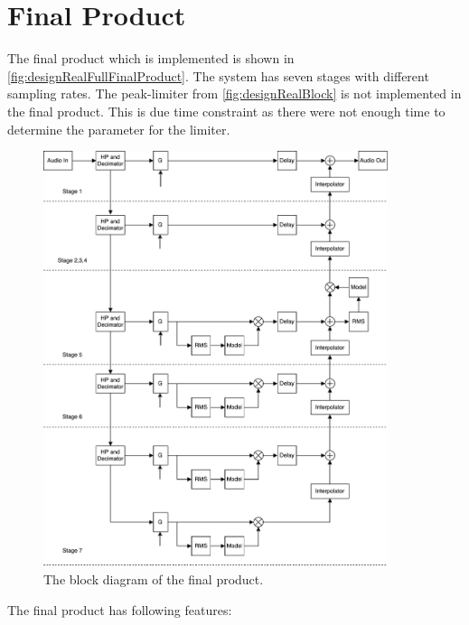 \chapter{Final Product} \label{ch:finalProduct}

The final product which is implemented is shown in \autoref{fig:designRealFullFinalProduct}. The system has seven stages with different sampling rates. The peak-limiter from \autoref{fig:designRealBlock} is not implemented in the final product. This is due time constraint as there were not enough time to determine the parameter for the limiter.

\begin{figure}[H]
\centering
\includegraphics[width=0.9\textwidth]{figures/designRealFullFinalProduct.pdf}
\caption{The block diagram of the final product.}
\label{fig:designRealFullFinalProduct}
\end{figure}

The final product has following features:

